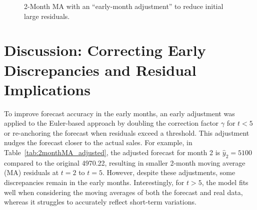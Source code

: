 \documentclass[10pt]{article}
\begin{document}
\begin{figure}[H]
\centering
{}
\caption{2-Month MA with an “early-month adjustment” to reduce initial large residuals.}
\label{fig:2monthMA_early_graph}
\end{figure}
\section{Discussion: Correcting Early Discrepancies and Residual Implications}
\label{sec:discussion}

To improve forecast accuracy in the early months, an early adjustment was applied to the Euler-based approach by doubling the correction factor \(\gamma\) for \(t<5\) or re-anchoring the forecast when residuals exceed a threshold. This adjustment nudges the forecast closer to the actual sales. For example, in Table~\ref{tab:2monthMA_adjusted}, the adjusted forecast for month 2 is \(\hat{y}_2=5100\) compared to the original 4970.22, resulting in smaller 2-month moving average (MA) residuals at \(t=2\) to \(t=5\). However, despite these adjustments, some discrepancies remain in the early months. Interestingly, for \(t>5\), the model fits well when considering the moving averages of both the forecast and real data, whereas it struggles to accurately reflect short-term variations.
\end{document}
